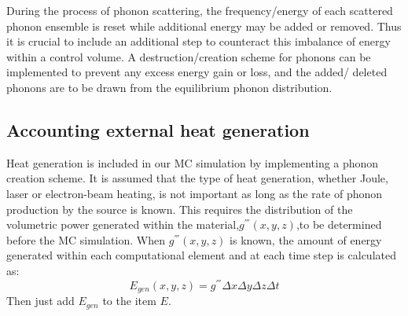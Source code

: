 \noindent During the process of phonon scattering, the frequency/energy
of each scattered phonon ensemble is reset while additional energy
may be added or removed. Thus it is crucial to include an additional
step to counteract this imbalance of energy within a control
volume. A destruction/creation scheme for phonons can be implemented
to prevent any excess energy gain or loss, and the added/
deleted phonons are to be drawn from the equilibrium phonon distribution\cite{BTE1}.

\subsection*{Accounting external heat generation}
Heat generation is included in our MC simulation by implementing
a phonon creation scheme. It is assumed that the type
of heat generation, whether Joule, laser or electron-beam heating,
is not important as long as the rate of phonon production by the
source is known. This requires the distribution of the volumetric
power generated within the material,$g^{'''}(x,y,z)$,to be determined
before the MC simulation. When
$g^{'''}(x,y,z)$ is known, the amount
of energy generated within each computational element and at
each time step is calculated as:
\begin{equation}
E_{gen}(x,y,z)=g^{'''} \Delta x \Delta y \Delta z \Delta t
\end{equation}
Then just add $E_{gen}$ to the item $E$.

